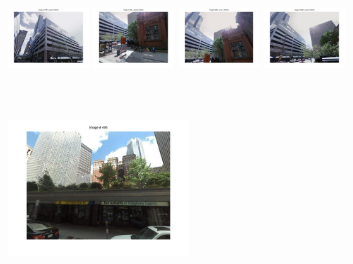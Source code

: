 \begin{figure}[t!]
\begin{minipage}{0.75\linewidth}
\begin{minipage}{\linewidth}
            \end{minipage}
            \\
            \begin{minipage}{\linewidth}
                \colorbox{myRed}{\includegraphics[trim = 35mm 30mm 35mm 30mm, clip=true, height=16mm]{imgs/Pval/exImproved02/improved01.jpg}}
                \colorbox{myRed}{\includegraphics[trim = 35mm 30mm 35mm 30mm, clip=true, height=16mm]{imgs/Pval/exImproved02/improved02.jpg}}
                \colorbox{myRed}{\includegraphics[trim = 35mm 30mm 35mm 30mm, clip=true, height=16mm]{imgs/Pval/exImproved02/improved03.jpg}}
                \colorbox{myRed}{\includegraphics[trim = 35mm 30mm 35mm 30mm, clip=true, height=16mm]{imgs/Pval/exImproved02/improved04.jpg}}
            \end{minipage} 
        \end{minipage}
        \vspace{3mm}
        \\
        \begin{minipage}{0.34\linewidth}
            \centering
            \vspace{0mm}
            \includegraphics[trim = 45mm 40mm 45mm 30mm, clip=true, height=36mm]{imgs/Pval/exImproved03/query.jpg}

\end{minipage}
\end{figure}
